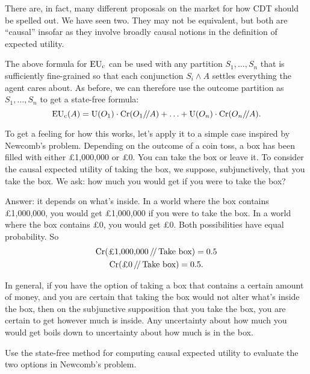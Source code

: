 There are, in fact, many different proposals on the market for how CDT should be
spelled out. We have seen two. They may not be equivalent, but both are
``causal'' insofar as they involve broadly causal notions in the definition of
expected utility.

The above formula for $\text{EU}_\text{c}$ can be used with any partition
$S_{1},\ldots,S_{n}$ that is sufficiently fine-grained so that each conjunction
 $S_{i} \land A$ settles everything the agent cares about. As before, we can
therefore use the outcome partition as $S_{1},\ldots,S_{n}$ to get a state-free
formula:
\[
  \text{EU}_\text{c}(A) = \text{U}(O_1) \cdot \text{Cr}(O_1/\!/A) + \ldots + \text{U}(O_n) \cdot \text{Cr}(O_n/\!/A).
\]

To get a feeling for how this works, let's apply it to a simple case inspired by
Newcomb's problem. Depending on the outcome of a coin toss, a box has been
filled with either £1,000,000 or £0. You can take the box or leave it. To
consider the causal expected utility of taking the box, we suppose,
subjunctively, that you take the box. We ask: how much you would get if you were
to take the box?

Answer: it depends on what's inside. In a world where the box contains
£1,000,000, you would get £1,000,000 if you were to take the box. In a world
where the box contains £0, you would get £0. Both possibilities have equal
probability. So
\begin{gather*}
  \text{Cr}(\text{£1,000,000}\,/\!/\,\text{Take box}) = 0.5\\
  \text{Cr}(\text{£0}\,/\!/\,\text{Take box}) = 0.5.
\end{gather*}

In general, if you have the option of taking a box that contains a certain
amount of money, and you are certain that taking the box would not alter what's
inside the box, then on the subjunctive supposition that you take the box, you
are certain to get however much is inside. Any uncertainty about how much you
would get boils down to uncertainty about how much is in the box.

\begin{exercise}{2}
  Use the state-free method for computing causal expected utility to evaluate
  the two options in Newcomb's problem.
\end{exercise}


